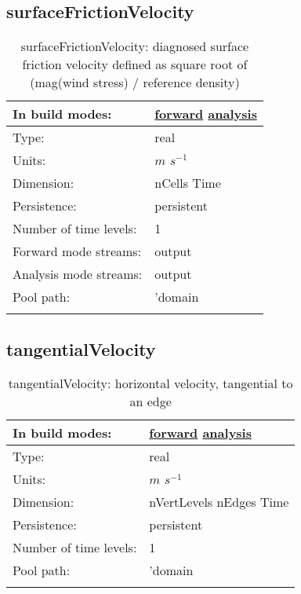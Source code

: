 \subsection[surfaceFrictionVelocity]{surfaceFrictionVelocity}
\label{subsec:var_sec_diagnostics_surfaceFrictionVelocity}
\begin{center}
\begin{longtable}{| p{2.0in} | p{4.0in} |}
        \hline 
        In build modes: & \hyperref[subsec:forward_var_tab_diagnostics]{forward} \hyperref[subsec:analysis_var_tab_diagnostics]{analysis} \\
        \hline 
        Type: & real \\
        \hline 
        Units: & $m$ $s^{-1}$ \\
        \hline 
        Dimension: & nCells Time \\
        \hline 
        Persistence: & persistent \\
        \hline 
        Number of time levels: & 1 \\
        \hline 
		 Forward mode streams: &  output \\
        \hline 
		 Analysis mode streams: &  output \\
        \hline 
            Pool path: & 'domain %
 \\
		 \hline 
    \caption{surfaceFrictionVelocity: diagnosed surface friction velocity defined as square root of (mag(wind stress) / reference density)}
\end{longtable}
\end{center}
\subsection[tangentialVelocity]{tangentialVelocity}
\label{subsec:var_sec_diagnostics_tangentialVelocity}
\begin{center}
\begin{longtable}{| p{2.0in} | p{4.0in} |}
        \hline 
        In build modes: & \hyperref[subsec:forward_var_tab_diagnostics]{forward} \hyperref[subsec:analysis_var_tab_diagnostics]{analysis} \\
        \hline 
        Type: & real \\
        \hline 
        Units: & $m$ $s^{-1}$ \\
        \hline 
        Dimension: & nVertLevels nEdges Time \\
        \hline 
        Persistence: & persistent \\
        \hline 
        Number of time levels: & 1 \\
        \hline 
            Pool path: & 'domain %
 \\
		 \hline 
    \caption{tangentialVelocity: horizontal velocity, tangential to an edge}
\end{longtable}
\end{center}
